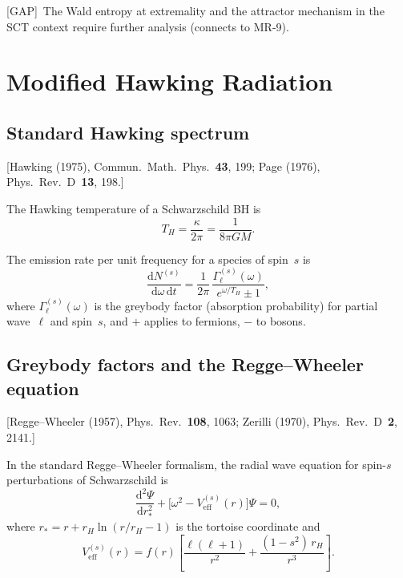\documentclass[12pt,a4paper]{article}
\theoremstyle{definition}
\theoremstyle{remark}
\newcommand{\dd}{\mathrm{d}}
\newcommand{\fromlit}[1]{\textcolor{blue!70!black}{\textsf{[#1]}}}
\newcommand{\gap}{\textcolor{red!80!black}{\textsf{[GAP]}}}
\begin{document}
\gap\ The Wald entropy at extremality and the attractor mechanism
in the SCT context require further analysis (connects to MR-9).


\section{Modified Hawking Radiation}
\label{sec:hawking}

\subsection{Standard Hawking spectrum}
\fromlit{Hawking (1975), Commun.\ Math.\ Phys.~\textbf{43}, 199;
Page (1976), Phys.\ Rev.\ D~\textbf{13}, 198.}

The Hawking temperature of a Schwarzschild BH is
\begin{equation}
  T_H = \frac{\kappa}{2\pi} = \frac{1}{8\pi GM}.
\end{equation}

The emission rate per unit frequency for a species of spin~$s$ is
\begin{equation}\label{eq:hawking-rate}
  \frac{\dd N^{(s)}}{\dd\omega\,\dd t}
  = \frac{1}{2\pi}\,\frac{\Gamma^{(s)}_\ell(\omega)}
  {e^{\omega/T_H} \pm 1},
\end{equation}
where $\Gamma^{(s)}_\ell(\omega)$ is the greybody factor (absorption
probability) for partial wave~$\ell$ and spin~$s$, and $+$ applies
to fermions, $-$ to bosons.

\subsection{Greybody factors and the Regge--Wheeler equation}
\fromlit{Regge--Wheeler (1957), Phys.\ Rev.~\textbf{108}, 1063;
Zerilli (1970), Phys.\ Rev.\ D~\textbf{2}, 2141.}

In the standard Regge--Wheeler formalism, the radial wave equation
for spin-$s$ perturbations of Schwarzschild is
\begin{equation}\label{eq:RW}
  \frac{\dd^2 \Psi}{\dd r_*^2}
  + \bigl[\omega^2 - V^{(s)}_{\mathrm{eff}}(r)\bigr]\Psi = 0,
\end{equation}
where $r_* = r + r_H\ln(r/r_H - 1)$ is the tortoise coordinate and
\begin{equation}
  V^{(s)}_{\mathrm{eff}}(r) = f(r)\left[
    \frac{\ell(\ell+1)}{r^2}
    + \frac{(1-s^2)\,r_H}{r^3}
  \right].
\end{equation}
\end{document}
